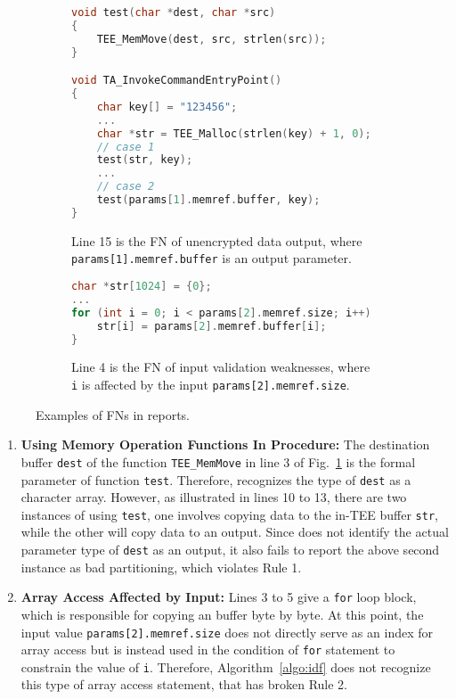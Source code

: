 \begin{figure}[t]
  \centering
  \begin{subfigure}[b]{\linewidth}
    \begin{lstlisting}[language=c++]
void test(char *dest, char *src)
{
    TEE_MemMove(dest, src, strlen(src));
}

void TA_InvokeCommandEntryPoint()
{
    char key[] = "123456";
    ...
    char *str = TEE_Malloc(strlen(key) + 1, 0);
    // case 1
    test(str, key);
    ...
    // case 2
    test(params[1].memref.buffer, key);
}
    \end{lstlisting}
    \caption{Line 15 is the FN of unencrypted data output, where \texttt{params[1].memref.buffer} is an output parameter.}
    \label{fig:fn1}
  \end{subfigure}
  \hfill
  \begin{subfigure}[b]{\linewidth}
    \begin{lstlisting}[language=c++]
char *str[1024] = {0};
...
for (int i = 0; i < params[2].memref.size; i++) {
    str[i] = params[2].memref.buffer[i];
}
    \end{lstlisting}
    \caption{Line 4 is the FN of input validation weaknesses, where \texttt{i} is affected by the input \texttt{params[2].memref.size}.}
    \label{fig:fn2}
  \end{subfigure}
  \caption{Examples of FNs in \ccSysName reports.}
  \label{fig:fn}
\end{figure}

\begin{enumerate}
    \item \textbf{Using Memory Operation Functions In Procedure:} The destination buffer \texttt{dest} of the function \texttt{TEE\_MemMove} in line 3 of Fig.~\ref{fig:fn1} is the formal parameter of function \texttt{test}.
    Therefore, \ccSysName recognizes the type of \texttt{dest} as a character array.
    However, as illustrated in lines 10 to 13, there are two instances of using \texttt{test}, one involves copying data to the in-TEE buffer \texttt{str}, while the other will copy data to an output.
    Since \ccSysName does not identify the actual parameter type of \texttt{dest} as an output, it also fails to report the above second instance as bad partitioning, which violates Rule 1.
    \item \textbf{Array Access Affected by Input:} Lines 3 to 5 give a \texttt{for} loop block, which is responsible for copying an buffer byte by byte.
    At this point, the input value \texttt{params[2].memref.size} does not directly serve as an index for array access but is instead used in the condition of \texttt{for} statement to constrain the value of \texttt{i}.
    Therefore, Algorithm~\ref{algo:idf} does not recognize this type of array access statement, that has broken Rule 2.
\end{enumerate}

